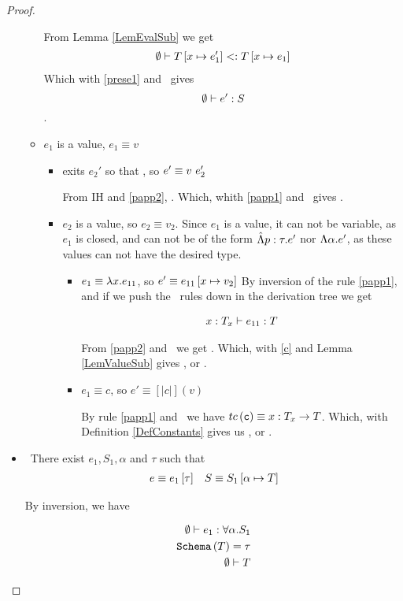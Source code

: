 \begin{proof}
\begin{itemize}
\begin{itemize}
From Lemma \ref{LemEvalSub} we get 
\begin{align*}
{\emptyset}\vdash {T\ensuremath{ \left[ x \mapsto e_1' \right] }}<:{T \left[ x \mapsto e_1 \right] }
\end{align*}
Which with \ref{prese1} and \tsub\ gives
$$\emptyset \vdash e' : S$$.
	\item $e_1$ is a value, $e_1 \equiv v$
	\begin{itemize}
		\item exits $e_2'$ so that , so $e' \equiv {v} \ {e_2'}$
		
		From IH and \ref{papp2}, . 
		Which, whith \ref{papp1} and \tapp\ gives .
		\item $e_2$ is a value, so $e_2 \equiv v_2$.
		Since $e_1$ is a value, it can not be variable, as $e_1$ is closed,
		and can not be of the form $\hat{\Lambda} p : \tau . e'$ nor $\Lambda \alpha . e'$,
		as these values can not have the desired type. 
		\begin{itemize}
			\item $e_1 \equiv \lambda x . e_{11}$, so $e' \equiv e_{11} \left[ x \mapsto v_2 \right] $
			By inversion of the rule \ref{papp1}, and if we push the \tsub \ rules down in the derivation tree we get
			 
			\begin{align}
			x:T_x \vdash e_{11} : T \label{c}
			\end{align}
			
			From  \ref{papp2} and \wsExt \ we get .
			Which, with \ref{c} and Lemma \ref{LemValueSub} gives 
			, or  
			.  
			\item $e_1 \equiv c$, so $e' \equiv [|c|](v)$
			
			By rule \ref{papp1} and \tconst \ we have 
			$tc\left(\texttt{c}\right) \equiv x : T_x \rightarrow T$.
			Which, with Definition \ref{DefConstants} gives us 
			, or 
			. 
		\end{itemize}
	\end{itemize}
\end{itemize}
\item \tinst\ There exist $e_1, S_1, \alpha$ and $\tau$ such that
\begin{align*}
e \equiv {e_1} \left[ {\tau}\right] && S \equiv S_1 \left[ \alpha \mapsto T \right] 
\end{align*}

By inversion, we have

\begin{align}
\emptyset \vdash e_1 : \forall \alpha . S_1 \label{d1}\\
\texttt{Schema}\left(T\right) = \tau \label{e1}\\
\emptyset \vdash T  \label{f}
\end{align} 


\end{itemize}
\end{proof}
